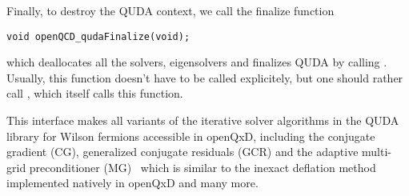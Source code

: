 



Finally, to destroy the QUDA context, we call the finalize function
\begin{verbatim}
void openQCD_qudaFinalize(void);
\end{verbatim}
which deallocates all the solvers, eigensolvers and finalizes QUDA by calling . Usually, this function doesn't have to be called explicitely, but one should rather call , which itself calls this function.

This interface makes all variants of the iterative solver algorithms in the QUDA library for Wilson fermions accessible in openQxD, including the conjugate gradient (CG), generalized conjugate residuals (GCR) and the adaptive multi-grid preconditioner (MG)~\cite{Babich:2010qb} which is similar to the inexact deflation method implemented natively in openQxD and many more.

